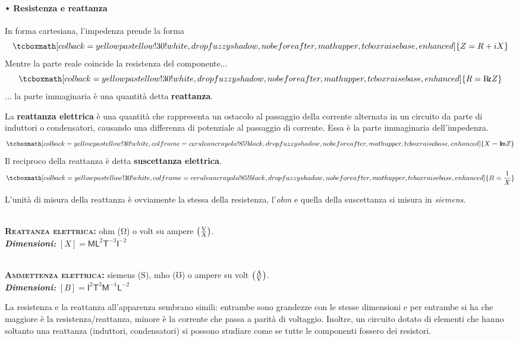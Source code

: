 \paragraph{⋆ Resistenza e reattanza}
In forma cartesiana, l'impedenza prende la forma
\begin{equation}
	\tcboxmath[colback=yellowpastellow!30!white,drop fuzzy shadow, nobeforeafter, math upper, tcbox raise base, enhanced]{Z=R+iX}
\end{equation}
Mentre la parte reale coincide la resistenza del componente...
\begin{equation}
	\tcboxmath[colback=yellowpastellow!30!white,drop fuzzy shadow, nobeforeafter, math upper, tcbox raise base, enhanced]{R=\Re Z}
\end{equation}
... la parte immaginaria è una quantità detta \textbf{reattanza}.
\begin{define}[Reattanza]
	La \textbf{reattanza elettrica} è una quantità che rappresenta un ostacolo al passaggio della corrente alternata in un circuito da parte di induttori o condensatori, causando una differenza di potenziale al passaggio di corrente. Essa è la parte immaginaria dell'impedenza.
	\begin{equation}
		\tcboxmath[colback=yellowpastellow!30!white,colframe=ceruleancrayola!85!black,drop fuzzy shadow, nobeforeafter, math upper, tcbox raise base, enhanced]{X=\Im Z}
	\end{equation}
	Il reciproco della reattanza è detta \textbf{suscettanza elettrica}.
	\begin{equation}
		\tcboxmath[colback=yellowpastellow!30!white,colframe=ceruleancrayola!85!black,drop fuzzy shadow, nobeforeafter, math upper, tcbox raise base, enhanced]{B=\frac{1}{X}}
	\end{equation}
\end{define}
L'unità di misura della reattanza è ovviamente la stessa della resistenza, l'\textit{ohm} e quella della suscettanza si misura in \textit{siemens}.
\begin{units}~\\
	\textbf{\textsc{Reattanza elettrica:}} ohm ($\unit{\ohm}$) o volt su ampere $\left(\unit[per-mode = fraction]{\volt\per\ampere}\right)$.\\
	\textit{\textbf{Dimensioni:}} $[X]=\mathsf{M} \mathsf{L}^2  \mathsf{T}^{-3}\mathsf{I}^{-2}$
\end{units}
\begin{units}~\\
	\textbf{\textsc{Ammettenza elettrica:}} siemens ($\unit{\siemens}$), mho  ($\mho$) o ampere su volt $\left(\unit[per-mode = fraction]{\ampere\per\volt}\right)$.\\
	\textit{\textbf{Dimensioni:}} $[B]=\mathsf{I}^{2}\mathsf{T}^{3}\mathsf{M}^{-1} \mathsf{L}^{-2}$
\end{units}
\noindent La resistenza e la reattanza all'apparenza sembrano simili: entrambe sono grandezze con le stesse dimensioni e per entrambe si ha che maggiore è la resistenza/reattanza, minore è la corrente che passa a parità di voltaggio. Inoltre, un circuito dotato di elementi che hanno soltanto una reattanza (induttori, condensatori) si possono studiare come se tutte le componenti fossero dei resistori.

